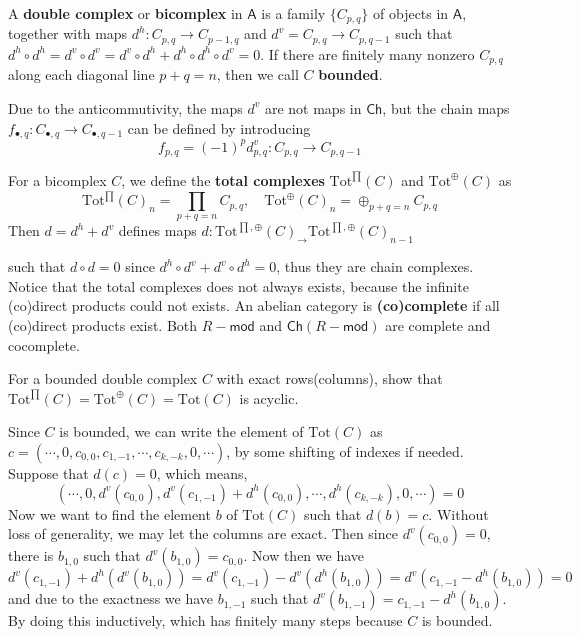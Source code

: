 \begin{exmp} A \textbf{double complex} or \textbf{bicomplex} in $\mathsf{A}$ is a family $\{C_{p,q}\}$ of objects in $\mathsf{A}$, together with maps $d^h:C_{p,q}\rightarrow C_{p-1,q}$ and $d^v=C_{p,q}\rightarrow C_{p,q-1}$ such that $d^h\circ d^h=d^v\circ d^v=d^v\circ d^h+d^h\circ d^h\circ d^v=0$. If there are finitely many nonzero $C_{p,q}$ along each diagonal line $p+q=n$, then we call $C$ \textbf{bounded}.

Due to the anticommutivity, the maps $d^v$ are not maps in $\mathsf{Ch}$, but the chain maps $f_{\bullet,q}:C_{\bullet,q}\rightarrow C_{\bullet,q-1}$ can be defined by introducing
\begin{equation}
f_{p,q}=(-1)^p d_{p,q}^v:C_{p,q}\rightarrow C_{p,q-1}
\end{equation}
\end{exmp}

\begin{exmp} For a bicomplex $C$, we define the \textbf{total complexes} $\textrm{Tot}^{\prod}(C)$ and $\textrm{Tot}^{\oplus}(C)$ as
\begin{equation}
\textrm{Tot}^{\prod} (C)_n=\prod_{p+q=n}C_{p,q},\quad \textrm{Tot}^\oplus (C)_n=\oplus_{p+q=n}C_{p,q}
\end{equation}
Then $d=d^h+d^v$ defines maps $d:\textrm{Tot}^{\prod,\oplus}(C)_\rightarrow \textrm{Tot}^{\prod,\oplus}(C)_{n-1}$

such that $d\circ d=0$ since $d^h\circ d^v+d^v\circ d^h=0$, thus they are chain complexes. Notice that the total complexes does not always exists, because the infinite (co)direct products could not exists. An abelian category is \textbf{(co)complete} if all (co)direct products exist. Both $R-\mathsf{mod}$ and $\mathsf{Ch}(R-\mathsf{mod})$ are complete and cocomplete.
\end{exmp}

\begin{exer} For a bounded double complex $C$ with exact rows(columns), show that $\textrm{Tot}^{\prod}(C)=\textrm{Tot}^{\oplus}(C)=\textrm{Tot}(C)$ is acyclic.
\end{exer}
\begin{solution} Since $C$ is bounded, we can write the element of $\textrm{Tot}(C)$ as $c=(\cdots,0,c_{0,0},c_{1,-1},\cdots,c_{k,-k},0,\cdots)$, by some shifting of indexes if needed. Suppose that $d(c)=0$, which means,
\begin{equation}
(\cdots,0,d^v(c_{0,0}),d^v(c_{1,-1})+d^h(c_{0,0}),\cdots,d^h(c_{k,-k}),0,\cdots)=0
\end{equation}
Now we want to find the element $b$ of $\textrm{Tot}(C)$ such that $d(b)=c$. Without loss of generality, we may let the columns are exact. Then since $d^v(c_{0,0})=0$, there is $b_{1,0}$ such that $d^v(b_{1,0})=c_{0,0}$. Now then we have
\begin{equation}
d^v(c_{1,-1})+d^h(d^v(b_{1,0}))=d^v(c_{1,-1})-d^v(d^h(b_{1,0}))=d^v(c_{1,-1}-d^h(b_{1,0}))=0
\end{equation}
and due to the exactness we have $b_{1,-1}$ such that $d^v(b_{1,-1})=c_{1,-1}-d^h(b_{1,0})$. By doing this inductively, which has finitely many steps because $C$ is bounded.
\end{solution}

